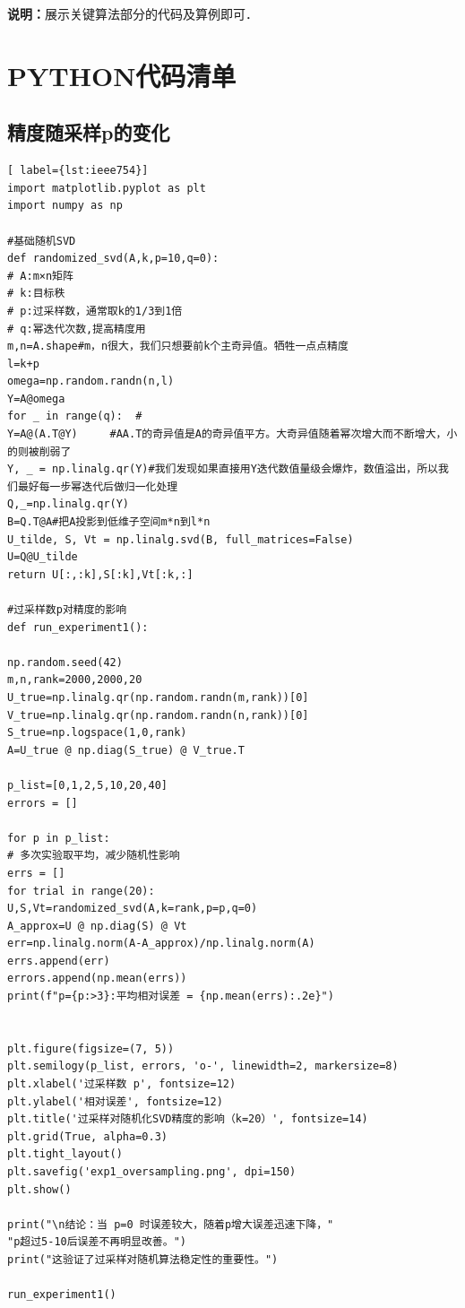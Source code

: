 \documentclass{article}
\begin{document}
\textbf{说明：}展示关键算法部分的代码及算例即可．


	\appendix %
	\section{PYTHON代码清单} %
	\subsection{精度随采样p的变化}
	\begin{lstlisting}[ label={lst:ieee754}]
import matplotlib.pyplot as plt
import numpy as np

#基础随机SVD
def randomized_svd(A,k,p=10,q=0):
# A:m×n矩阵
# k:目标秩
# p:过采样数，通常取k的1/3到1倍
# q:幂迭代次数,提高精度用
m,n=A.shape#m，n很大，我们只想要前k个主奇异值。牺牲一点点精度
l=k+p
omega=np.random.randn(n,l)
Y=A@omega
for _ in range(q):  #
Y=A@(A.T@Y)     #AA.T的奇异值是A的奇异值平方。大奇异值随着幂次增大而不断增大，小的则被削弱了
Y, _ = np.linalg.qr(Y)#我们发现如果直接用Y迭代数值量级会爆炸，数值溢出，所以我们最好每一步幂迭代后做归一化处理
Q,_=np.linalg.qr(Y)
B=Q.T@A#把A投影到低维子空间m*n到l*n
U_tilde, S, Vt = np.linalg.svd(B, full_matrices=False)
U=Q@U_tilde
return U[:,:k],S[:k],Vt[:k,:]

#过采样数p对精度的影响
def run_experiment1():

np.random.seed(42)
m,n,rank=2000,2000,20
U_true=np.linalg.qr(np.random.randn(m,rank))[0]
V_true=np.linalg.qr(np.random.randn(n,rank))[0]
S_true=np.logspace(1,0,rank)
A=U_true @ np.diag(S_true) @ V_true.T 

p_list=[0,1,2,5,10,20,40]
errors = []

for p in p_list:
# 多次实验取平均，减少随机性影响
errs = []
for trial in range(20):
U,S,Vt=randomized_svd(A,k=rank,p=p,q=0)
A_approx=U @ np.diag(S) @ Vt
err=np.linalg.norm(A-A_approx)/np.linalg.norm(A)
errs.append(err)
errors.append(np.mean(errs))
print(f"p={p:>3}:平均相对误差 = {np.mean(errs):.2e}")


plt.figure(figsize=(7, 5))
plt.semilogy(p_list, errors, 'o-', linewidth=2, markersize=8)
plt.xlabel('过采样数 p', fontsize=12)
plt.ylabel('相对误差', fontsize=12)
plt.title('过采样对随机化SVD精度的影响（k=20）', fontsize=14)
plt.grid(True, alpha=0.3)
plt.tight_layout()
plt.savefig('exp1_oversampling.png', dpi=150)
plt.show()

print("\n结论：当 p=0 时误差较大，随着p增大误差迅速下降，"
"p超过5-10后误差不再明显改善。")
print("这验证了过采样对随机算法稳定性的重要性。")

run_experiment1()


\end{lstlisting}
\end{document}
